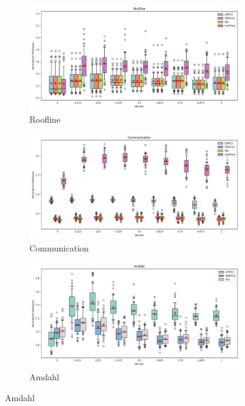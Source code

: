 \documentclass{article}
\begin{document}
\begin{figure}[htbp]
\centering
\begin{subfigure}[b]{0.32\textwidth}\includegraphics[width=\textwidth]{Results/Density/Density_Roofline_boxplot}\caption{Roofline}\label{fig:boxplot_figures_Density_Roofline}\end{subfigure}
\hfill
\begin{subfigure}[b]{0.32\textwidth}\includegraphics[width=\textwidth]{Results/Density/Density_Communication_boxplot}\caption{Communication}\label{fig:boxplot_figures_Density_Communication}\end{subfigure}
\hfill
\begin{subfigure}[b]{0.32\textwidth}\includegraphics[width=\textwidth]{Results/Density/Density_Amdahl_boxplot}\caption{Amdahl}\label{fig:boxplot_figures_Density_Amdahl}\end{subfigure}

\end{figure}
\end{document}
